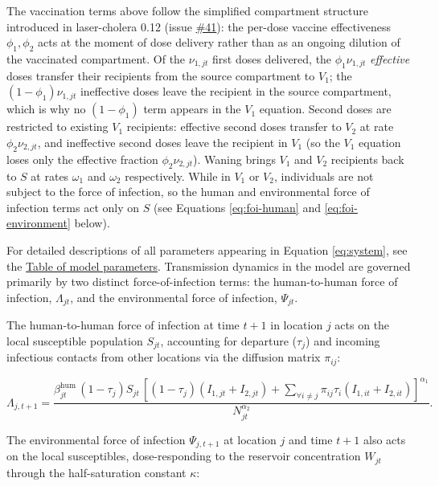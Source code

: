 \documentclass[
]{book}
\begin{document}
The vaccination terms above follow the simplified compartment structure introduced in laser-cholera 0.12 (issue \href{https://github.com/InstituteforDiseaseModeling/laser-cholera/issues/41}{\#41}): the per-dose vaccine effectiveness \(\phi_1, \phi_2\) acts at the moment of dose delivery rather than as an ongoing dilution of the vaccinated compartment. Of the \(\nu_{1,jt}\) first doses delivered, the \(\phi_1\nu_{1,jt}\) \emph{effective} doses transfer their recipients from the source compartment to \(V_1\); the \((1-\phi_1)\nu_{1,jt}\) ineffective doses leave the recipient in the source compartment, which is why no \((1-\phi_1)\) term appears in the \(V_1\) equation. Second doses are restricted to existing \(V_1\) recipients: effective second doses transfer to \(V_2\) at rate \(\phi_2\nu_{2,jt}\), and ineffective second doses leave the recipient in \(V_1\) (so the \(V_1\) equation loses only the effective fraction \(\phi_2\nu_{2,jt}\)). Waning brings \(V_1\) and \(V_2\) recipients back to \(S\) at rates \(\omega_1\) and \(\omega_2\) respectively. While in \(V_1\) or \(V_2\), individuals are not subject to the force of infection, so the human and environmental force of infection terms act only on \(S\) (see Equations \eqref{eq:foi-human} and \eqref{eq:foi-environment} below).

For detailed descriptions of all parameters appearing in Equation \eqref{eq:system}, see the \hyperref[parameters-table]{Table of model parameters}. Transmission dynamics in the model are governed primarily by two distinct force-of-infection terms: the human-to-human force of infection, \(\Lambda_{jt}\), and the environmental force of infection, \(\Psi_{jt}\).

The human-to-human force of infection at time \(t+1\) in location \(j\) acts on the local susceptible population \(S_{jt}\), accounting for departure (\(\tau_j\)) and incoming infectious contacts from other locations via the diffusion matrix \(\pi_{ij}\):

\begin{equation}
\Lambda_{j,t+1} = \frac{
\beta_{jt}^{\text{hum}} \, (1-\tau_{j})S_{jt} \, \left[ (1-\tau_{j}) (I_{1,jt} + I_{2,jt}) + \sum_{\forall i \neq j} \pi_{ij}\tau_i(I_{1,it} + I_{2,it}) \right]^{\alpha_1}}{N_{jt}^{\alpha_2}}.
\label{eq:foi-human}
\end{equation}

The environmental force of infection \(\Psi_{j,t+1}\) at location \(j\) and time \(t+1\) also acts on the local susceptibles, dose-responding to the reservoir concentration \(W_{jt}\) through the half-saturation constant \(\kappa\):
\end{document}
